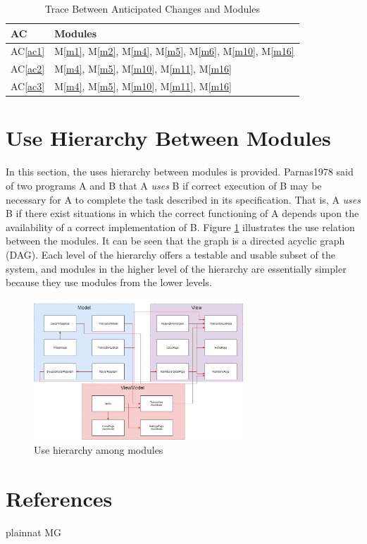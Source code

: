 \documentclass[12pt, titlepage]{article}
\newcommand{\acref}[1]{AC\ref{#1}}
\newcommand{\mref}[1]{M\ref{#1}}
\begin{document}
\begin{table}[H]
\centering
\begin{tabular}{p{} p{}}
\toprule
\textbf{AC} & \textbf{Modules}\\
\midrule
\acref{ac1} & \mref{m1}, \mref{m2}, \mref{m4}, \mref{m5}, \mref{m6}, \mref{m10}, \mref{m16}\\
\acref{ac2} & \mref{m4}, \mref{m5}, \mref{m10}, \mref{m11}, \mref{m16}\\
\acref{ac3} & \mref{m4}, \mref{m5}, \mref{m10}, \mref{m11}, \mref{m16}\\
\bottomrule
\end{tabular}
\caption{Trace Between Anticipated Changes and Modules}
\label{TblACT}
\end{table}

\section{Use Hierarchy Between Modules} \label{SecUse}

In this section, the uses hierarchy between modules is
provided. Parnas1978 said of two programs A and B that A {\em uses} B if
correct execution of B may be necessary for A to complete the task described in
its specification. That is, A {\em uses} B if there exist situations in which
the correct functioning of A depends upon the availability of a correct
implementation of B.  Figure \ref{FigUH} illustrates the use relation between
the modules. It can be seen that the graph is a directed acyclic graph
(DAG). Each level of the hierarchy offers a testable and usable subset of the
system, and modules in the higher level of the hierarchy are essentially simpler
because they use modules from the lower levels.

\begin{figure}[H]
\centering
\includegraphics[width=0.7\textwidth]{UsesHierarchy.png}
\caption{Use hierarchy among modules}
\label{FigUH}
\end{figure}

\section*{References}

 {plainnat}
 {MG}
\end{document}
